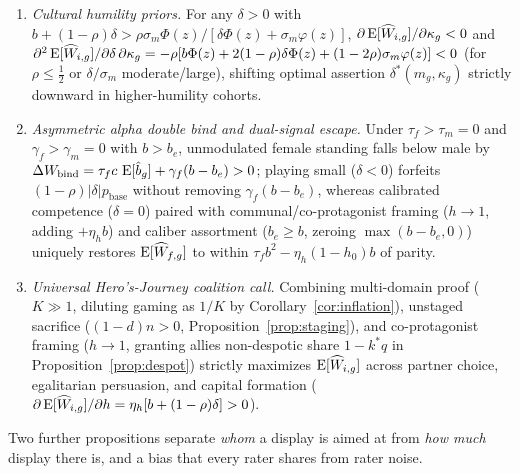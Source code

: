 \begin{proposition}
\begin{enumerate}[leftmargin=1.5em,itemsep=1pt,topsep=2pt]
\item[(ii)] \emph{Cultural humility priors.} For any $\delta>0$ with $b+(1-\rho)\delta>\rho\sigma_m\Phi(z)/[\delta\Phi(z)+\sigma_m\varphi(z)]$, $\partial\operatorname{E}[\widehat W_{i,g}]/\partial\kappa_g<0$ and $\partial^2\operatorname{E}[\widehat W_{i,g}]/\partial\delta\,\partial\kappa_g=-\rho[b\Phi(z)+2(1-\rho)\delta\Phi(z)+(1-2\rho)\sigma_m\varphi(z)]<0$ (for $\rho\le\tfrac12$ or $\delta/\sigma_m$ moderate/large), shifting optimal assertion $\delta^*(m_g,\kappa_g)$ strictly downward in higher-humility cohorts.
\item[(iii)] \emph{Asymmetric alpha double bind and dual-signal escape.} Under $\tau_f>\tau_m=0$ and $\gamma_f>\gamma_m=0$ with $b>b_e$, unmodulated female standing falls below male by $\Delta W_{\mathrm{bind}}=\tau_f c\,\operatorname{E}[\hat b_g]+\gamma_f(b-b_e)>0$; playing small ($\delta<0$) forfeits $(1-\rho)|\delta|p_{\mathrm{base}}$ without removing $\gamma_f(b-b_e)$, whereas calibrated competence ($\delta=0$) paired with communal/co-protagonist framing ($h\to 1$, adding $+\eta_h b$) and caliber assortment ($b_e\ge b$, zeroing $\max(b-b_e,0)$) uniquely restores $\operatorname{E}[\widehat W_{f,g}]$ to within $\tau_f b^2-\eta_h(1-h_0)b$ of parity.
\item[(iv)] \emph{Universal Hero's-Journey coalition call.} Combining multi-domain proof ($K\gg 1$, diluting gaming as $1/K$ by Corollary~\ref{cor:inflation}), unstaged sacrifice ($(1-d)n>0$, Proposition~\ref{prop:staging}), and co-protagonist framing ($h\to 1$, granting allies non-despotic share $1-k^*q$ in Proposition~\ref{prop:despot}) strictly maximizes $\operatorname{E}[\widehat W_{i,g}]$ across partner choice, egalitarian persuasion, and capital formation ($\partial\operatorname{E}[\widehat W_{i,g}]/\partial h=\eta_h[b+(1-\rho)\delta]>0$).
\end{enumerate}
\end{proposition}

Two further propositions separate \emph{whom} a display is aimed at from \emph{how much} display there is, and a bias that every rater shares from rater noise.

